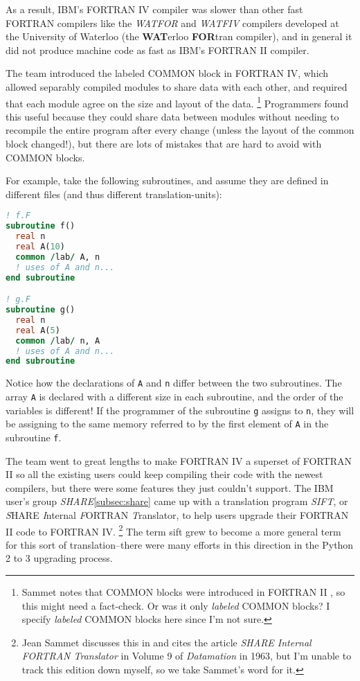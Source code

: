 As a result, IBM's FORTRAN IV compiler was slower than other fast FORTRAN compilers
like the \textit{WATFOR} and \textit{WATFIV} compilers developed at the University of Waterloo
(the \textbf{WAT}erloo \textbf{FOR}tran compiler\cite{cress_dirksen_graham_watfor_fortran_iv_1970}),
and in general it did not produce machine code as fast as IBM's FORTRAN II compiler.

The team introduced the labeled COMMON block in FORTRAN IV, which allowed
separably compiled modules to share data with each other,
and required that each module agree on the size and layout of the data.
\footnote{Sammet notes that COMMON blocks were introduced in FORTRAN II
	\cite[Section IV.3.1.]{sammet_programming_languages_history_and_fundamentals_1969},
	so this might need a fact-check. Or was it only \textit{labeled} COMMON blocks?
	I specify \textit{labeled} COMMON blocks here since I'm not sure.}
Programmers found this useful because they could share data between modules
without needing to recompile the entire program after every change
(unless the layout of the common block changed!),
but there are lots of mistakes that are hard to avoid with COMMON blocks.

For example, take the following subroutines, and assume they are
defined in different files (and thus different \gls{translation-unit}s):

\begin{lstlisting}[language=fortran,frame=single]
! f.F
subroutine f()
  real n
  real A(10)
  common /lab/ A, n
  ! uses of A and n...
end subroutine

! g.F
subroutine g()
  real n
  real A(5)
  common /lab/ n, A
  ! uses of A and n...
end subroutine
\end{lstlisting}

Notice how the declarations of \texttt{A} and \texttt{n} differ between the two
subroutines. The array \texttt{A} is declared with a different size in each subroutine,
and the order of the variables is different!
If the programmer of the subroutine \texttt{g} assigns to \texttt{n}, they
will be assigning to the same memory referred to by the first element of \texttt{A}
in the subroutine \texttt{f}.

The team went to great lengths to make FORTRAN IV a superset of FORTRAN II
so all the existing users could keep compiling their code with the newest
compilers, but there were some features they just couldn't support.
The IBM user's group \textit{SHARE}\cref{subsec:share} came up with a
translation program \textit{SIFT}, or
\textit{S}HARE \textit{I}nternal \textit{F}ORTRAN \textit{T}ranslator,
to help users upgrade their FORTRAN II code to FORTRAN IV.
\footnote{
	Jean Sammet discusses this in 
	and cites the article \textit{SHARE Internal FORTRAN Translator} in
	Volume 9 of \textit{Datamation} in 1963, but I'm unable to track this
	edition down myself, so we take Sammet's word for it.}
The term \gls{sift} grew to become a more general term for this sort of
translation--there were many efforts in this direction in the Python 2 to
3 upgrading process.

